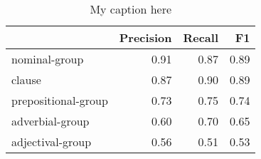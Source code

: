 \begin{table}[!ht]
\centering
\begin{tabular}{lrrr}
\toprule
{} &  Precision &  Recall &   F1 \\
\midrule
nominal-group       &       0.91 &    0.87 & 0.89 \\
clause              &       0.87 &    0.90 & 0.89 \\
prepositional-group &       0.73 &    0.75 & 0.74 \\
adverbial-group     &       0.60 &    0.70 & 0.65 \\
adjectival-group    &       0.56 &    0.51 & 0.53 \\
\bottomrule
\end{tabular}
\caption{My caption here}
\label{tab:unit-types-combined-F1}
\end{table}